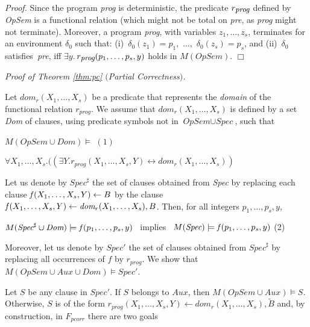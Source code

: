 \documentclass[english]{tlp}
\newcommand{\eop}{\hfill$\Box$}
\begin{document}
\medskip

\noindent
{\it Proof.} 
Since the program \textit{prog}  is deterministic, 
the predicate $r_{\textit{\small prog}}$ defined by \textit{OpSem} is 
a functional relation (which might not be total on \textit{pre}, as 
\textit{prog} might not terminate).
Moreover, a program \textit{prog}, with variables $z_{1},\ldots,z_{s}$,
terminates for an environment $\delta_{0}$ such that:
(i)~$\delta_{0}(z_{1})\!=\!p_{1},$ $\ldots,$ $\delta_{0}(z_{s})\!=\!p_{s}$,
and (ii)~$\delta_{0}$  satisfies~\textit{pre},
iff  $\exists y$.\,$r_{\textit{\small prog}}(p_1,\ldots,p_s,y) $ holds in 
$M(\textit{OpSem})$. \hfill\eop

\medskip

\noindent
{\it Proof of Theorem \ref{thm:pc} $($Partial Correctness$)$.}

\noindent
Let $\textit{dom}_r(X_1,\ldots,X_s)$ be  a predicate that
represents the {\it domain} of the functional relation $r_{\textit{prog}}$.
We assume that   $\textit{dom}_r(X_1,\ldots,X_s)$ is defined by
a set \textit{Dom} of clauses, using predicate symbols not in $\textit{OpSem} \cup \textit{Spec}$, such that 

$M(\textit{OpSem}\cup \textit{Dom})\models$ \hfill $(1)$

\hspace{20mm}$\forall X_1,\ldots,X_s\textit{.} ( (\exists Y\textit{.}  r_{\textit{prog}}(X_1,\ldots,X_s,Y) \leftrightarrow \textit{dom}_r(X_1,\ldots,X_s))$ 

\noindent
Let us denote by $\textit{Spec}^{\sharp}$ the set of clauses obtained from 
\textit{Spec} by replacing each clause  $\textit{f\/}(X_1,\ldots,X_s,Y) \leftarrow B$
by the clause $\textit{f\/}(X_1,\ldots,X_s,Y) \leftarrow \textit{dom}_r(X_1,\ldots,X_s), B$.
Then,  for all integers $p_1,\ldots,p_s,y$,

\smallskip

$M(\textit{Spec}^{\sharp} \cup \textit{Dom}) \models \textit{f\/}(p_1,\ldots,p_s,y) $ \ implies \ $M(\textit{Spec}) \models \textit{f\/}(p_1,\ldots,p_s,y) $  \hfill (2)

\smallskip

\noindent
Moreover,  let us denote by $\textit{Spec}'$ the set of clauses obtained from $\textit{Spec}^{\sharp}$ by replacing all occurrences of $f$ by $r_{\textit{prog}}$.
We show that  $M(\textit{OpSem}\cup \textit{Aux}\cup \textit{Dom}) \models \textit{Spec}'$.

\noindent
Let  $S$ be any clause in $\textit{Spec}'$. If $S$ belongs to  $\textit{Aux}$, then $M(\textit{OpSem}\cup \textit{Aux}) \models S$.
Otherwise, $S$ is of the form $r_{\textit{prog}}(X_1,\ldots,X_s,Y) \leftarrow \textit{dom}_r(X_1,\ldots,X_s), \widetilde{B}$ and, by construction,  in $F_{\textit{pcorr}}$
there are two goals
\end{document}
